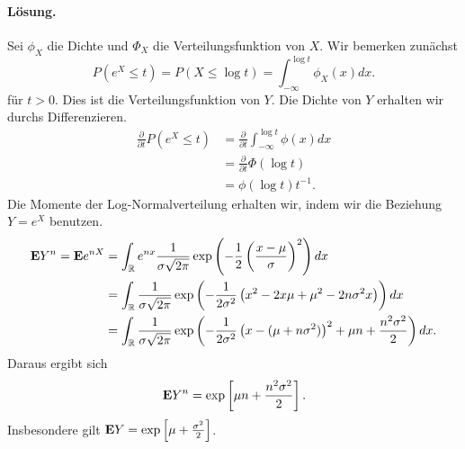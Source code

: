 \paragraph*{Lösung.}
Sei $\phi_X$ die Dichte und $\Phi_X$ die Verteilungsfunktion von $X$. Wir bemerken zunächst
\begin{equation*}
    P \left( e^{X} \leq t \right) = P \left( X \leq \log t \right) = 
    \int_{- \infty}^{\log t} \phi_X (x) dx. 
\end{equation*}
für $t>0$. Dies ist die Verteilungsfunktion von $Y$. Die Dichte von $Y$
erhalten wir durchs Differenzieren.
\begin{align*}
    \frac{\partial}{\partial t} P \left( e^X \leq t \right) &= 
    \frac{\partial}{\partial t} \int_{-\infty}^{\log t} \phi(x) dx \\
    &= \frac{\partial}{\partial t} \Phi(\log t) \\
    &= \phi(\log t) t^{-1}. 
\end{align*}
Die Momente der Log-Normalverteilung erhalten wir, indem wir die Beziehung $Y=e^{X}$ benutzen. 
\begin{align*}
    \mathbf{E} Y^n = \mathbf{E} e^{nX} &= \int_{\mathbb R}^{} e^{nx} \frac{1}{\sigma \sqrt{2\pi} } 
    \exp \left( -\frac{1}{2} \left( \frac{x-\mu}{\sigma} \right)^2 \right) dx \\
    &= \int_{\mathbb R} \frac{1}{ \sigma \sqrt{2\pi}} \exp \left( 
    -\frac{1}{2\sigma^2} \left( x^2 - 2 x \mu + \mu^2 - 2n \sigma^2 x \right)
    \right) dx \\
    &= \int_{ \mathbb R}^{} \frac{1}{ \sigma \sqrt{2\pi} } 
    \exp \left( -\frac{1}{2\sigma^2} \left( x - (\mu + n \sigma^2) \right)^2
    + \mu n + \frac{n^2 \sigma^2}{ 2}
    \right) dx.
\end{align*}
Daraus ergibt sich
\begin{equation*}
    \mathbf{E} Y^n = \exp \left[ \mu n + \frac{n^2 \sigma^2}{2} \right]. 
\end{equation*}
Insbesondere gilt $\mathbf{E} Y = \exp \left[ \mu + \frac{\sigma^2}{2} \right]$.

